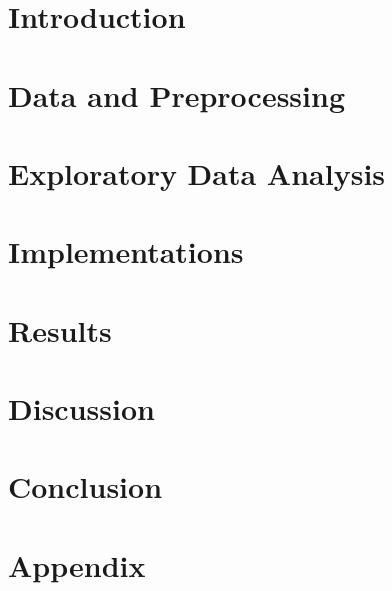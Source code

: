 \documentclass[a4paper,11pt]{article}
\begin{document}


\newpage

\section{Introduction}
\label{sec:Introduction}



\section{Data and Preprocessing}
\label{sec:Data_and_preprocessing}



\section{Exploratory Data Analysis}
\label{sec:EDA}



\section{Implementations}
\label{sec:Implementations}



\section{Results}
\label{sec:Results}



\section{Discussion}
\label{sec:Discussion}


\newpage

\section{Conclusion}
\label{sec:Conclusion}


\newpage

\printbibliography

\newpage

\section*{Appendix}
\label{sec:Appendix}

\end{document}

